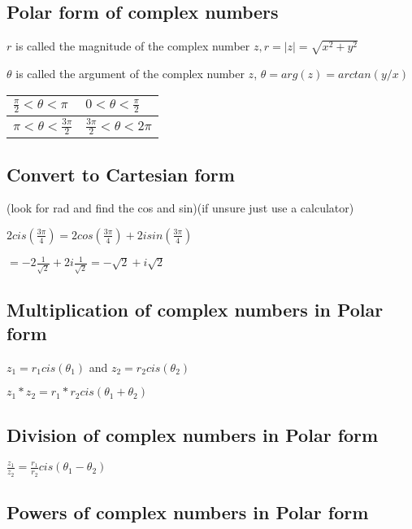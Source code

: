 \documentclass{extarticle}
\begin{document}
\begin{multicols}{2}
\subsection{Polar form of complex numbers}

$r$ is called the magnitude of the complex number $z, r=\left|z\right|=\sqrt{x^2+y^2}$

$\theta$ is called the argument of the complex number $z$, $\theta=arg\left(z\right)=arctan{\left(y/x\right)}$

\begin{tabu}{|X|X|}
    \hline
$\frac{\pi}{2}<\theta<\pi$ & $0<\theta<\frac{\pi}{2}$ \\ \hline
$\pi<\theta<\frac{3\pi}{2}$ & $\frac{3\pi}{2}<\theta<2\pi$ \\ \hline
    \end{tabu}







\subsection{Convert to Cartesian form}

(look for rad and find the cos and sin)(if unsure just use a calculator)

$2cis\left(\frac{3\pi}{4}\right)=2cos{\left(\frac{3\pi}{4}\right)}+2isin{\left(\frac{3\pi}{4}\right)}$

$=-2\frac{1}{\sqrt2}+2i\frac{1}{\sqrt2}=-\sqrt2+i\sqrt2$

\subsection{Multiplication of complex numbers in Polar form}

$z_1=r_1cis\left(\theta_1\right)$ and $z_2=r_2cis\left(\theta_2\right)$

$z_1\ast z_2=r_1\ast r_2cis\left(\theta_1+\theta_2\right)$

\subsection{Division of complex numbers in Polar form}

$\frac{z_1}{z_2}=\frac{r_1}{r_2}cis\left(\theta_1-\theta_2\right)$

\subsection{Powers of complex numbers in Polar form}


\end{multicols}
\end{document}
